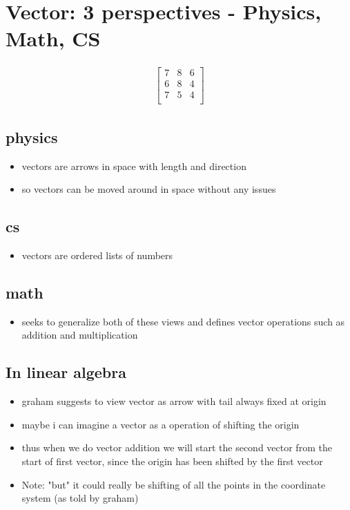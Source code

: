 \documentclass[a4paper]{article}
\begin{document}
\section{Vector: 3 perspectives - Physics, Math, CS }

\begin{align*}
	\begin{bmatrix}
		7 & 8 & 6 \\
		6 & 8 & 4 \\
		7 & 5 & 4 \\
	\end{bmatrix}
\end{align*}

\subsection{physics}
\begin{itemize}
	\item vectors are arrows in space with length and direction
	\item so vectors can be moved around in space without any issues
\end{itemize}

\subsection{cs}
\begin{itemize}
	\item vectors are ordered lists of numbers
\end{itemize}

\subsection{math}
\begin{itemize}
	\item seeks to generalize both of these views and defines vector operations such as
	      addition and multiplication
\end{itemize}

\subsection{In linear algebra}
\begin{itemize}
	\item graham suggests to view vector as arrow with tail always fixed at origin
	\item maybe i can imagine a vector as a operation of shifting the origin
	\item thus when we do vector addition we will start the second vector from the
	      start of first vector, since the origin has been shifted by the first vector
	\item Note: "but" it could really be shifting of all the points in the coordinate system
	      (as told by graham)
\end{itemize}
\end{document}

